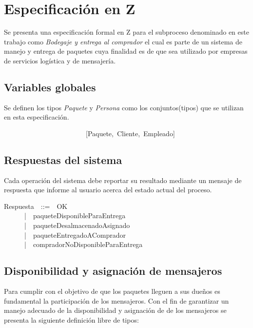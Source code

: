 \documentclass[12pt,a4paper]{article}
\begin{document}
\newpage
\section{Especificación en Z}

Se presenta una especificación formal en Z para el subproceso denominado en este trabajo como \textit{Bodegaje y entrega al comprador} el cual es parte de un sistema de manejo y entrega de paquetes cuya finalidad es de que sea utilizado por empresas de servicios logística y de mensajería.  

\subsection{Variables globales}
Se definen los tipos \textit{Paquete} y \textit{Persona}  como los conjuntos(tipos) que se utilizan en esta especificación. 

\begin{zed}
~~~~~~~~~~~~~~~~~~~~~~~~[Paquete,~Cliente,~Empleado]
\end{zed}

\subsection{Respuestas del sistema}

Cada operación del sistema debe reportar su resultado mediante un mensaje de respuesta que informe al usuario acerca del estado actual del proceso.

\begin{zed}
Respuesta~~::=~~OK\\
~~~~~~|~~paqueteDisponibleParaEntrega\\
~~~~~~|~~paqueteDesalmacenadoAsignado\\
~~~~~~|~~paqueteEntregadoAComprador\\
~~~~~~|~~compradorNoDisponibleParaEntrega\\
\end{zed}

\subsection{Disponibilidad y asignación de mensajeros}
\indent Para cumplir con el objetivo de que los paquetes lleguen a sus dueños es fundamental la participación de los mensajeros. Con el fin de garantizar un manejo adecuado de la disponibilidad y asignación de de los mensajeros se presenta la siguiente definición libre de tipos:
\end{document}
